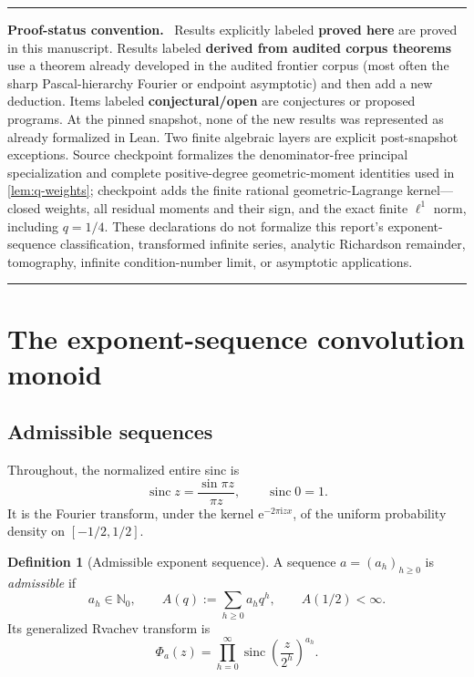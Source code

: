 \documentclass[11pt,oneside]{article}
\numberwithin{equation}{section}
\theoremstyle{definition}
\newtheorem{definition}[theorem]{Definition}
\theoremstyle{remark}
\newcommand{\N}{\mathbb N}
\newcommand{\sinc}{\operatorname{sinc}}
\newcommand{\e}{\mathrm e}
\newcommand{\ii}{\mathrm i}
\newcommand{\statusproved}{\textcolor{deepgreen}{\textbf{proved here}}}
\newcommand{\statusderived}{\textcolor{linkblue}{\textbf{derived from audited corpus theorems}}}
\newcommand{\statusopen}{\textcolor{deepred}{\textbf{conjectural/open}}}
\newenvironment{statusbox}[1]{%
  \par\medskip\noindent\begin{center}\begin{minipage}{0.94\textwidth}%
  \color{linkblue}\hrule\vspace{0.65em}%
  \color{black}\textbf{\color{linkblue}#1.}\ }{%
  \par\vspace{0.65em}\color{linkblue}\hrule
  \end{minipage}\end{center}\medskip}
\begin{document}
\begin{statusbox}{Proof-status convention}
Results explicitly labeled \statusproved{} are proved in this manuscript.  Results labeled
\statusderived{} use a theorem already developed in the audited frontier corpus (most often
the sharp Pascal-hierarchy Fourier or endpoint asymptotic) and then add a new deduction.
Items labeled \statusopen{} are conjectures or proposed programs.  At the pinned snapshot,
none of the new results was represented as already formalized in Lean.  Two finite algebraic
layers are explicit post-snapshot exceptions.  Source checkpoint
 formalizes the
denominator-free principal specialization and complete positive-degree geometric-moment
identities used in \cref{lem:q-weights}; checkpoint
 adds the finite rational
geometric-Lagrange kernel---closed weights, all residual moments and their sign, and the exact
finite \(\ell^1\) norm, including \(q=1/4\).  These declarations do not formalize this
report's exponent-sequence classification, transformed infinite series, analytic Richardson
remainder, tomography, infinite condition-number limit, or asymptotic applications.
\end{statusbox}

\section{The exponent-sequence convolution monoid}
\label{sec:master}

\subsection{Admissible sequences}

Throughout, the normalized entire sinc is
\begin{equation}
 \sinc z=\frac{\sin\pi z}{\pi z},\qquad \sinc0=1.
 \label{eq:sinc-normalized}
\end{equation}
It is the Fourier transform, under the kernel $\e^{-2\pi\ii zx}$, of the uniform
probability density on $[-1/2,1/2]$.

\begin{definition}[Admissible exponent sequence]
A sequence $a=(a_h)_{h\ge0}$ is \emph{admissible} if
\[
 a_h\in\N_0,
 \qquad
 A(q):=\sum_{h\ge0}a_hq^h,
 \qquad
 A(1/2)<\infty.
\]
Its generalized Rvachev transform is
\begin{equation}
 \Phi_a(z)=\prod_{h=0}^{\infty}
 \sinc\!\left(\frac{z}{2^h}\right)^{a_h}.
 \label{eq:Phi-a}
\end{equation}
\end{definition}
\end{document}
